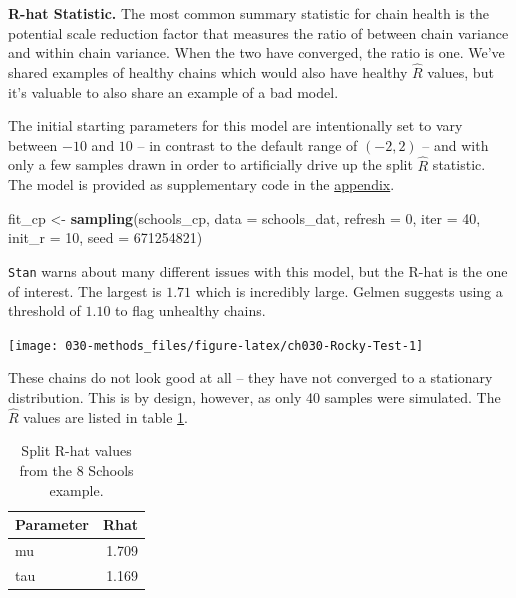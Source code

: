 \documentclass[11pt, oneside, openany]{scrbook}
\newenvironment{Shaded}{\begin{snugshade}}{\end{snugshade}}
\newcommand{\AttributeTok}[1]{\textcolor[rgb]{0.13,0.29,0.53}{#1}}
\newcommand{\DecValTok}[1]{\textcolor[rgb]{0.00,0.00,0.81}{#1}}
\newcommand{\FunctionTok}[1]{\textcolor[rgb]{0.13,0.29,0.53}{\textbf{#1}}}
\newcommand{\NormalTok}[1]{#1}
\newcommand{\OtherTok}[1]{\textcolor[rgb]{0.56,0.35,0.01}{#1}}
\begin{document}
\textbf{R-hat Statistic.} The most common summary statistic for chain health is the potential scale reduction factor \citep{gelman1992inference} that measures the ratio of between chain variance and within chain variance. When the two have converged, the ratio is one. We've shared examples of healthy chains which would also have healthy \(\hat{R}\) values, but it's valuable to also share an example of a bad model.

The initial starting parameters for this model are intentionally set to vary between \(-10\) and \(10\) -- in contrast to the default range of \((-2, 2)\) -- and with only a few samples drawn in order to artificially drive up the split \(\hat{R}\) statistic. The model is provided as supplementary code in the \protect\hyperlink{code}{appendix}.


\begin{Shaded}
\begin{Highlighting}[]
\NormalTok{fit\_cp }\OtherTok{\textless{}{-}} \FunctionTok{sampling}\NormalTok{(schools\_cp, }\AttributeTok{data =}\NormalTok{ schools\_dat, }\AttributeTok{refresh =} \DecValTok{0}\NormalTok{,}
                   \AttributeTok{iter =} \DecValTok{40}\NormalTok{, }\AttributeTok{init\_r =} \DecValTok{10}\NormalTok{, }\AttributeTok{seed =} \DecValTok{671254821}\NormalTok{)}
\end{Highlighting}
\end{Shaded}


\texttt{Stan} warns about many different issues with this model, but the R-hat is the one of interest. The largest is \(1.71\) which is incredibly large. Gelmen suggests using a threshold of \(1.10\) to flag unhealthy chains.

\begin{center}\texttt{[image: 030-methods\_files/figure-latex/ch030-Rocky-Test-1]} \end{center}

These chains do not look good at all -- they have not converged to a stationary distribution. This is by design, however, as only 40 samples were simulated. The \(\hat{R}\) values are listed in table \ref{tab:ch030-Ninth-Finger}.

\begin{table}[!h]
\centering
\caption{\label{tab:ch030-Ninth-Finger}Split R-hat values from the 8 Schools example.}
\centering
\begin{tabular}[t]{lr}
\toprule
Parameter & Rhat\\
\midrule
mu & 1.709\\
tau & 1.169\\
\bottomrule
\end{tabular}
\end{table}
\end{document}

